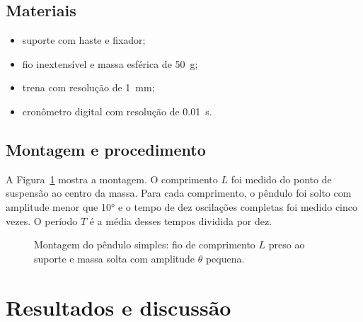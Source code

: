 \documentclass[12pt,a4paper]{report}
\newif\ifinstrucoes
\newcommand{\instrucao}[1]{\ifinstrucoes{\color{gray}\small\itshape #1\par}\fi}
\begin{document}
\subsection{Materiais}
\begin{itemize}
  \item suporte com haste e fixador;
  \item fio inextensível e massa esférica de \qty{50}{\gram};
  \item trena com resolução de \qty{1}{\milli\metre};
  \item cronômetro digital com resolução de \qty{0.01}{\second}.
\end{itemize}

\subsection{Montagem e procedimento}
A Figura~\ref{fig:montagem} mostra a montagem. O comprimento $L$ foi medido do ponto de suspensão ao centro da massa. Para cada comprimento, o pêndulo foi solto com amplitude menor que \ang{10} e o tempo de dez oscilações completas foi medido cinco vezes. O período $T$ é a média desses tempos dividida por dez.

\begin{figure}[htbp]
  \centering
  \caption{Montagem do pêndulo simples: fio de comprimento $L$ preso ao suporte e massa solta com amplitude $\theta$ pequena.}
  \label{fig:montagem}
\end{figure}

\section{Resultados e discussão}
\instrucao{Apresente os dados em tabela, com unidades no cabeçalho e incertezas. Mostre o gráfico, diga como foi feito o ajuste e compare o resultado com um valor de referência. Discuta as fontes de erro mais importantes.}
\end{document}
